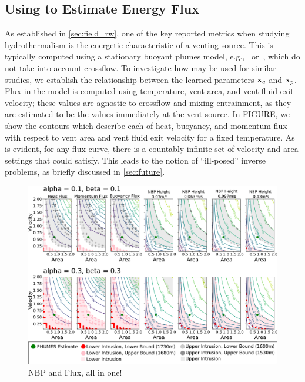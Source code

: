 \subsection{Using \PHUMES to Estimate Energy Flux}
As established in \cref{sec:field_rw}, one of the key reported metrics when studying hydrothermalism is the energetic characteristic of a venting source. This is typically computed using a stationary buoyant plumes model, e.g.,~\cite{morton1956turbulent} or~\cite{speer1989model}, which do not take into account crossflow. To investigate how \PHUMES may be used for similar studies, we establish the relationship between the learned parameters $\mathbf{x}_c$ and $\mathbf{x}_p$. Flux in the model is computed using temperature, vent area, and vent fluid exit velocity; these values are agnostic to crossflow and mixing entrainment, as they are estimated to be the values immediately at the vent source. In FIGURE, we show the contours which describe each of heat, buoyancy, and momentum flux with respect to vent area and vent fluid exit velocity for a fixed temperature. As is evident, for any flux curve, there is a countably infinite set of velocity and area settings that could satisfy. This leads to the notion of ``ill-posed'' inverse problems, as briefly discussed in \cref{sec:future}.

\begin{figure}[h!]
    \centering
    \includegraphics[width=1\columnwidth]{figures/flux_nbp.png}
    \caption{NBP and Flux, all in one!}
    \label{fig:nbp_flux}
\end{figure}

